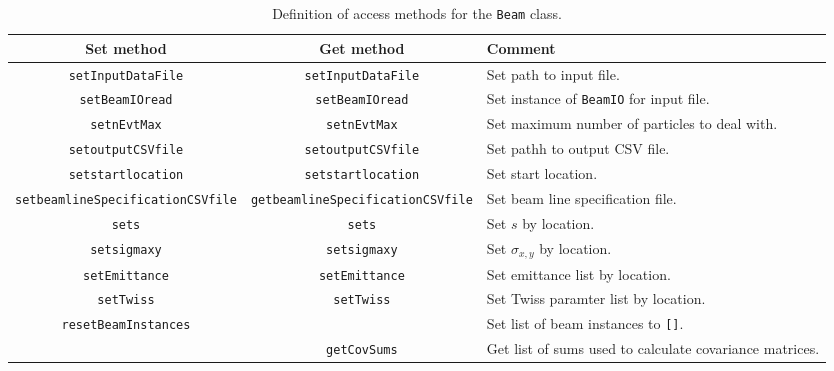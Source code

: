 \begin{sidewaystable}[h]
  \caption{
    Definition of access methods for the \texttt{Beam}
    class. 
  }
  \label{Tab:B:AccessMethods}
  \begin{center}
    \begin{tabular}{|c|c|p{9cm}|}
      \hline
      \textbf{Set method} & \textbf{Get method}  & \textbf{Comment}                                                      \\
      \hline
      \texttt{setInputDataFile}                & \texttt{setInputDataFile}                & Set path to input file.      \\
      \texttt{setBeamIOread}                   & \texttt{setBeamIOread}                   & Set instance of \texttt{BeamIO} for input file.  \\
      \texttt{setnEvtMax}                      & \texttt{setnEvtMax}                      & Set maximum number of particles to deal with.    \\
      \texttt{setoutputCSVfile}                & \texttt{setoutputCSVfile}                & Set pathh to output CSV file.                    \\
      \texttt{setstartlocation}                & \texttt{setstartlocation}                & Set start location.                              \\
      \texttt{setbeamlineSpecificationCSVfile} & \texttt{getbeamlineSpecificationCSVfile} & Set beam line specification file.                \\
      \texttt{sets}                            & \texttt{sets}                            & Set $s$ by location.                             \\
      \texttt{setsigmaxy}                      & \texttt{setsigmaxy}                      & Set $\sigma_{x,y}$ by location.                   \\
      \texttt{setEmittance}                    & \texttt{setEmittance}                    & Set emittance list by location.                  \\
      \texttt{setTwiss}                        & \texttt{setTwiss}                        & Set Twiss paramter list by location.             \\
      \texttt{resetBeamInstances}              &                                          & Set list of beam instances to \texttt{[]}.       \\
                                               & \texttt{getCovSums}                      & Get list of sums used to calculate covariance matrices. \\

\end{tabular}
\end{center}
\end{sidewaystable}
